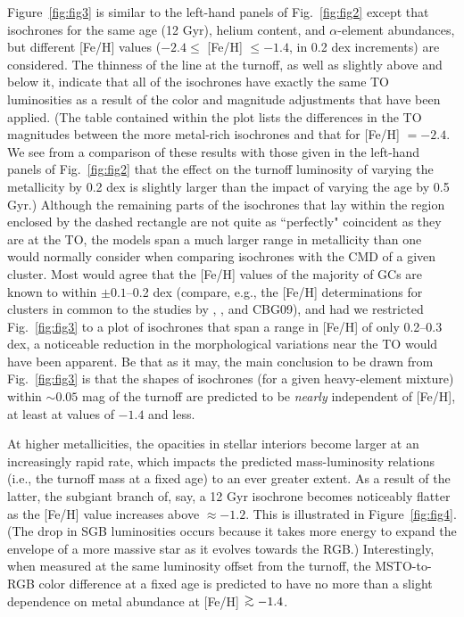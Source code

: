\documentclass[12pt,preprint]{aastex}
\newcommand\gta{\mathrel{\hbox{\raise 0.6 ex \hbox{$>$}\kern
                   -1.7 ex\lower .5 ex\hbox{$\sim$}}}}
\begin{document}
Figure~\ref{fig:fig3} is similar to the left-hand panels of Fig.~\ref{fig:fig2}
except that isochrones for the same age (12 Gyr), helium content, and
$\alpha$-element abundances, but different [Fe/H] values ($-2.4 \le$ [Fe/H]
$\le -1.4$, in 0.2 dex increments) are considered.  The thinness of the line at
the turnoff, as well as slightly above and below it, indicate that all of the
isochrones have exactly the same TO luminosities as a result of the color and
magnitude adjustments that have been applied.  (The table contained within the
plot lists the differences in the TO magnitudes between the more metal-rich
isochrones and that for [Fe/H] $= -2.4$.  We see from a comparison of these
results with those given in the left-hand panels of Fig.~\ref{fig:fig2} that the
effect on the turnoff luminosity of varying the metallicity by 0.2 dex is
slightly larger than the impact of varying the age by 0.5 Gyr.)  Although the
remaining parts of the isochrones that lay within the region enclosed by the
dashed rectangle are not quite as ``perfectly" coincident as they are at the TO,
the models span a much larger range in metallicity than one would normally
consider when comparing isochrones with the CMD of a given cluster.  Most would
agree that the [Fe/H] values of the majority of GCs are known to within $\pm
0.1$--0.2 dex (compare, e.g., the [Fe/H] determinations for clusters in common
to the studies by \citealt{zw84}, \citealt{ki03}, and CBG09), and had we
restricted Fig.~\ref{fig:fig3} to a plot of isochrones that span a range in
[Fe/H] of only 0.2--0.3 dex, a noticeable reduction in the morphological
variations near the TO would have been apparent.  Be that as it may, the main
conclusion to be drawn from Fig.~\ref{fig:fig3} is that the shapes of isochrones
(for a given heavy-element mixture) within $\sim 0.05$ mag of the turnoff are
predicted to be {\it nearly} independent of [Fe/H], at least at values of $-1.4$
and less.  

At higher metallicities, the opacities in stellar interiors become larger at an
increasingly rapid rate, which impacts the predicted mass-luminosity relations
(i.e., the turnoff mass at a fixed age) to an ever greater extent.  As a result
of the latter, the subgiant branch of, say, a 12 Gyr isochrone becomes
noticeably flatter as the [Fe/H] value increases above $\approx -1.2$.  This is
illustrated in Figure~\ref{fig:fig4}.  (The drop in SGB luminosities occurs
because it takes more energy to expand the envelope of a more massive star as it
evolves towards the RGB.)  Interestingly, when measured at the same luminosity
offset from the turnoff, the MSTO-to-RGB color difference at a fixed age is
predicted to have no more than a slight dependence on metal abundance at [Fe/H]
$\gta -1.4$.
\end{document}
